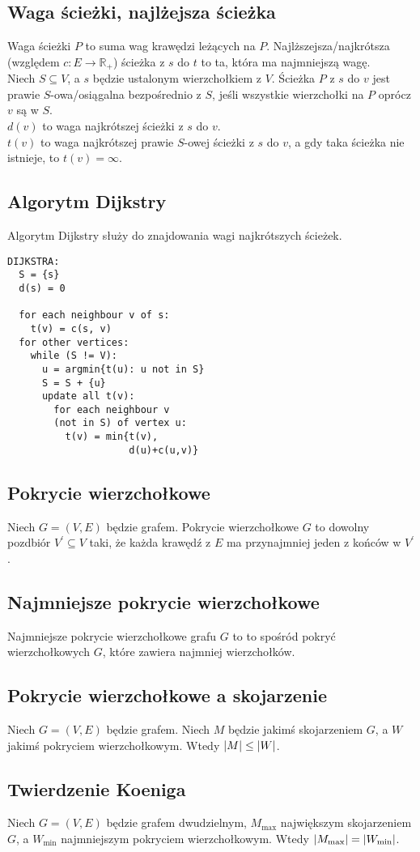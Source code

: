 \subsection*{Waga ścieżki, najlżejsza ścieżka}
Waga ścieżki $P$ to suma wag krawędzi leżących na $P$. Najlższejsza/najkrótsza
(względem $c : E \to \mathbb{R}_+$) ścieżka z $s$ do $t$ to ta, która ma 
najmniejszą wagę. \\
Niech $S \subseteq V$, a $s$ będzie ustalonym wierzchołkiem z $V$. Ścieżka $P$
z $s$ do $v$ jest prawie $S$-owa/osiągalna bezpośrednio z $S$, jeśli wszystkie
wierzchołki na $P$ oprócz $v$ są w $S$. \\
$d(v)$ to waga najkrótszej ścieżki z $s$ do $v$. \\
$t(v)$ to waga najkrótszej prawie $S$-owej ścieżki z $s$ do $v$, a gdy taka
ścieżka nie istnieje, to $t(v) = \infty$.

\subsection*{Algorytm Dijkstry}
Algorytm Dijkstry służy do znajdowania wagi najkrótszych ścieżek.
\begin{lstlisting}[style=code]
DIJKSTRA:
  S = {s}
  d(s) = 0

  for each neighbour v of s:
    t(v) = c(s, v)
  for other vertices:
    while (S != V):
      u = argmin{t(u): u not in S}
      S = S + {u}
      update all t(v):
        for each neighbour v 
        (not in S) of vertex u:
          t(v) = min{t(v),
                     d(u)+c(u,v)}
\end{lstlisting}

\subsection*{Pokrycie wierzchołkowe}
Niech $G = (V, E)$ będzie grafem. Pokrycie wierzchołkowe $G$ to dowolny
pozdbiór $V^\prime \subseteq V$ taki, że każda krawędź z $E$ ma przynajmniej
jeden z końców w $V^\prime$.

\subsection*{Najmniejsze pokrycie wierzchołkowe}
Najmniejsze pokrycie wierzchołkowe grafu $G$ to to spośród pokryć
wierzchołkowych $G$, które zawiera najmniej wierzchołków.

\subsection*{Pokrycie wierzchołkowe a skojarzenie}
Niech $G = (V, E)$ będzie grafem. Niech $M$ będzie jakimś skojarzeniem $G$, 
a $W$ jakimś pokryciem wierzchołkowym. Wtedy $\left| M \right| \leq \left| W \right|$.

\subsection*{Twierdzenie Koeniga}
Niech $G = (V, E)$ będzie grafem dwudzielnym, $M_{\max}$ największym skojarzeniem
$G$, a $W_{\min}$ najmniejszym pokryciem wierzchołkowym. Wtedy 
$\left| M_{\max} \right| = \left| W_{\min} \right|$.
